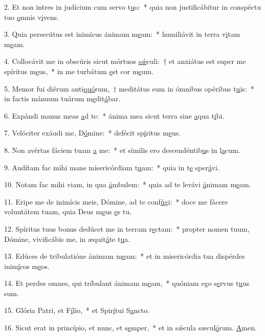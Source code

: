 2. Et non intres in judícium cum servo t\uline{u}o:~* quia non justificábitur in conspéctu tuo \uline{o}mnis v\uline{i}vens.\par 
3. Quia persecútus est inimícus ánimam m\uline{e}am:~* humiliávit in terra v\uline{i}tam m\uline{e}am.\par 
4. Collocávit me in obscúris sicut mórtuos \uline{sǽ}culi:~† et anxiátus est super me spíritus m\uline{e}us,~* in me turbátum \uline{e}st cor m\uline{e}um.\par 
5. Memor fui diérum anti\uline{quó}rum,~† meditátus sum in ómnibus opéribus t\uline{u}is:~* in factis mánuum tuárum m\uline{e}dit\uline{á}bar.\par 
6. Expándi manus meas \uline{a}d te:~* ánima mea sicut terra sine \uline{a}qua t\uline{i}bi.\par 
7. Velóciter exáudi me, D\uline{ó}mine:~* defécit sp\uline{í}ritus m\uline{e}us.\par 
8. Non avértas fáciem tuam \uline{a} me:~* et símilis ero descendéntib\uline{u}s in l\uline{a}cum.\par 
9. Audítam fac mihi mane misericórdiam t\uline{u}am:~* quia in t\uline{e} sper\uline{á}vi.\par 
10. Notam fac mihi viam, in qua \uline{á}mbulem:~* quia ad te levávi \uline{á}nimam m\uline{e}am.\par 
11. Eripe me de inimícis meis, Dómine, ad te conf\uline{ú}gi:~* doce me fácere voluntátem tuam, quia Deus m\uline{e}us \uline{e}s tu.\par 
12. Spíritus tuus bonus dedúcet me in terram r\uline{e}ctam:~* propter nomen tuum, Dómine, vivificábis me, in æquit\uline{á}te t\uline{u}a.\par 
13. Edúces de tribulatióne ánimam m\uline{e}am:~* et in misericórdia tua dispérdes inim\uline{í}cos m\uline{e}os.\par 
14. Et perdes omnes, qui tríbulant ánimam m\uline{e}am,~* quóniam ego s\uline{e}rvus t\uline{u}us sum.\par 
15. Glória Patri, et F\uline{í}lio,~* et Spir\uline{í}tui S\uline{a}ncto.\par 
16. Sicut erat in princípio, et nunc, et s\uline{e}mper,~* et in sǽcula sæcul\uline{ó}rum. \uline{A}men.\par 
